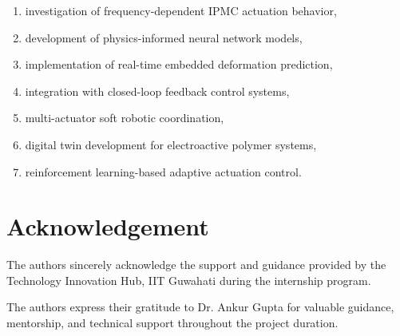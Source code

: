 \documentclass[11pt,a4paper]{article}
\begin{document}
\begin{enumerate}

\item investigation of frequency-dependent IPMC actuation behavior,

\item development of physics-informed neural network models,

\item implementation of real-time embedded deformation prediction,

\item integration with closed-loop feedback control systems,

\item multi-actuator soft robotic coordination,

\item digital twin development for electroactive polymer systems,

\item reinforcement learning-based adaptive actuation control.

\end{enumerate}


\section*{Acknowledgement}


The authors sincerely acknowledge the support and guidance provided by the Technology Innovation Hub, IIT Guwahati during the internship program.

The authors express their gratitude to Dr. Ankur Gupta for valuable guidance, mentorship, and technical support throughout the project duration.

\end{document}
